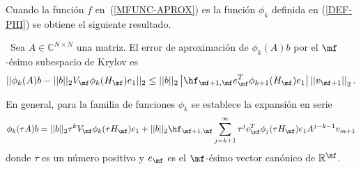 Cuando la funci\'on $f$ en~(\ref{MFUNC-APROX}) es la función $\phi_k$ definida en (\ref{DEF-PHI}) se obtiene el siguiente resultado.
\begin{theorem}
    \cite{Saad92,Sidje98}~Sea $A\in\mathbb{C}^{N\times N}$ una matriz. El error de aproximaci\'on de $\phi_k(A)b$ por el $\mf$-\'esimo subespacio de Krylov es
    \begin{equation}
        ||\phi_k(A)b - ||b||_2 V_\mf \phi_k(H_\mf)e_1||_2  \leq ||b||_2\left\lvert\hf_{\mf+1,\mf} e_\mf^T\phi_{k+1}(H_\mf)e_1\right\rvert\left\lvert\left\lvert v_{\mf+1}\right\rvert\right\rvert_2.
    \end{equation}
\end{theorem}

En general, para la familia de funciones $\phi_k$ se establece la expansión en serie \cite{Saad92,Sidje98}
\begin{equation}
\phi_k(\tau A)b=||b||_2\tau^{k} V_\mf \phi_k(\tau H_\mf)e_1 + ||b||_2\hf_{\mf+1,\mf}
\sum_{j=k+1}^{\infty}\tau^{j} e_\mf^T\phi_j(\tau H_\mf)e_1A^{j-k-1}v_{m+1} \label{PHI-EXPANSION}
\end{equation}
donde $\tau$ es un número positivo y $e_\mf$ es el  $\mf$-ésimo vector canónico de $\mathbb{R}^\mf$.


